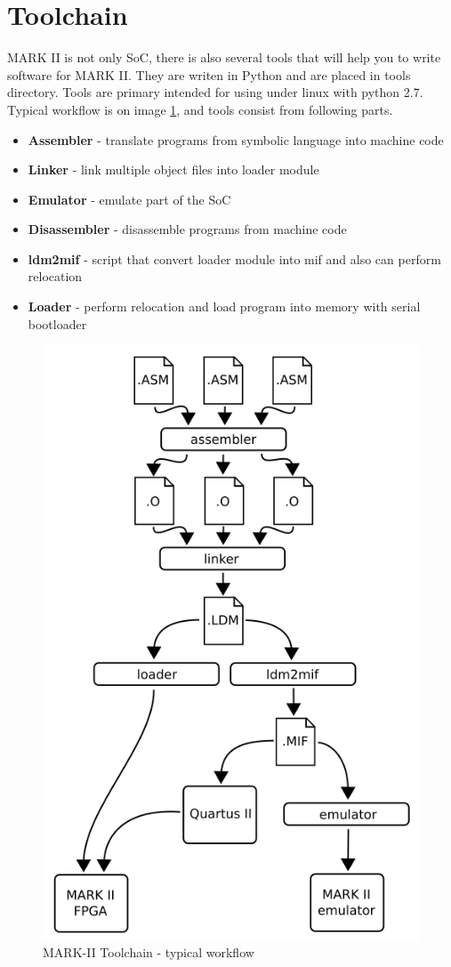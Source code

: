 \section{Toolchain}

MARK II is not only SoC, there is also several tools that will help you to
write software for MARK II. They are writen in Python and are placed in tools
directory. Tools are primary intended for using under linux with python 2.7.
Typical workflow is on image \ref{fig:toolchain_workflow}, and tools consist
from following parts.

\begin{itemize}
    \item \textbf{Assembler} - translate programs from symbolic language into machine code
    \item \textbf{Linker} - link multiple object files into loader module
    \item \textbf{Emulator} - emulate part of the SoC
    \item \textbf{Disassembler} - disassemble programs from machine code
    \item \textbf{ldm2mif} - script that convert loader module into mif and also can perform relocation
    \item \textbf{Loader} - perform relocation and load program into memory with serial bootloader
\end{itemize}

\begin{figure}[]
    \centering
    \includegraphics[width=.7\textwidth]{img/toolworkflow.png}
    \caption{MARK-II Toolchain - typical workflow}
    \label{fig:toolchain_workflow}
\end{figure}
